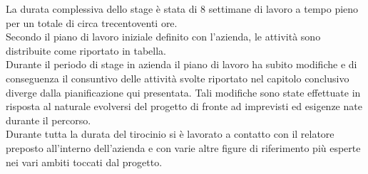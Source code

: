 La durata complessiva dello stage è stata di 8 settimane di lavoro a tempo pieno per un totale di circa trecentoventi ore.\\

Secondo il piano di lavoro iniziale definito con l'azienda, le attività sono distribuite come riportato in tabella.\\

Durante il periodo di stage in azienda il piano di lavoro ha subito modifiche e di conseguenza il consuntivo delle attività svolte riportato nel capitolo conclusivo diverge dalla pianificazione qui presentata. Tali modifiche sono state effettuate in risposta al naturale evolversi del progetto di fronte ad imprevisti ed esigenze nate durante il percorso. \\
Durante tutta la durata del tirocinio si è lavorato a contatto con il relatore preposto all'interno dell'azienda e con varie altre figure di riferimento più esperte nei vari ambiti toccati dal progetto.